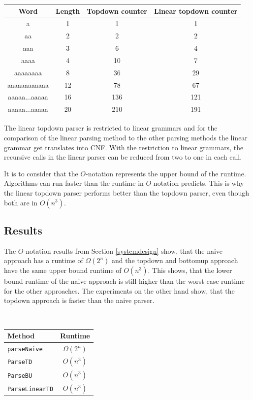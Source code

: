 \documentclass[a4paper, 11pt]{article}
\begin{document}
\begin{center}
\begin{tabular}{|c|c||c|c|}
\hline
Word & Length & Topdown counter & Linear topdown counter \\
\hline
\hline
a & 1 & 1 & 1 \\
\hline
aa & 2 & 2 & 2 \\
\hline
aaa & 3 & 6 & 4  \\
\hline
aaaa & 4 &  10  & 7  \\
\hline
aaaaaaaa & 8 & 36  & 29 \\
\hline
aaaaaaaaaaaa & 12 & 78 &  67  \\
\hline
aaaaa...aaaaa & 16 & 136 & 121  \\
\hline
aaaaa...aaaaa & 20 & 210 &191 \\
\hline
\end{tabular}
\end{center}


The linear topdown parser is restricted to linear grammars and for the comparison of the linear parsing method to the other parsing methods the linear grammar get translates into CNF. With the restriction to linear grammars, the recursive calls in the linear parser can be reduced from two to one in each call.

It is to consider that the $O$-notation represents the upper bound of the runtime. Algorithms can run faster than the runtime in $O$-notation predicts. This is why the linear topdown parser performs better than the topdown parser, even though both are in $O(n^3)$.

    
 



\subsection{Results}
\label{results}

\begin{minipage}{0.5\textwidth}
The $O$-notation results from Section \ref{systemdesign} show, that the naive approach has a runtime of $\Omega(2^n)$ and the topdown and bottomup approach have the same upper bound runtime of $O(n^3)$. This shows, that the lower bound runtime of the naive approach is still higher than the worst-case runtime for the other approaches.
The experiments on the other hand show, that the topdown approach is faster than the naive parser.
\end{minipage}
\begin{minipage}{0.1\textwidth} \ \end{minipage}
\begin{minipage}{0.3\textwidth}
\begin{tabular}{|l|c|}
\hline
Method & Runtime \\
\hline
\texttt{parseNaive} & $\Omega(2^n)$\\
\texttt{ParseTD} & $O(n^3)$ \\
\texttt{ParseBU} & $O(n^3)$\\
\texttt{ParseLinearTD} & $O(n^3)$\\
\hline
\end{tabular}
\end{minipage}
\end{document}
